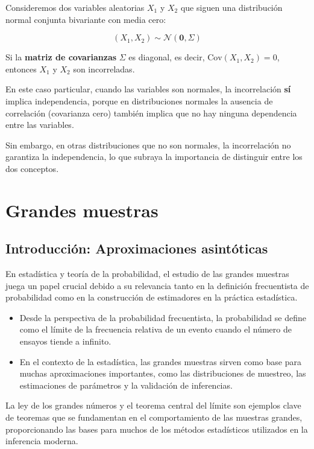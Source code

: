 \documentclass[
]{article}
\begin{document}
Consideremos dos variables aleatorias \(X_1\) y \(X_2\) que siguen una distribución normal conjunta bivariante con media cero:

\[
(X_1, X_2) \sim \mathcal{N}\left(\mathbf{0}, \Sigma \right)
\]

Si la \textbf{matriz de covarianzas} \(\Sigma\) es diagonal, es decir, \(\text{Cov}(X_1, X_2) = 0\), entonces \(X_1\) y \(X_2\) son incorreladas.

En este caso particular, cuando las variables son normales, la incorrelación \textbf{sí} implica independencia, porque en distribuciones normales la ausencia de correlación (covarianza cero) también implica que no hay ninguna dependencia entre las variables.

Sin embargo, en otras distribuciones que no son normales, la incorrelación no garantiza la independencia, lo que subraya la importancia de distinguir entre los dos conceptos.

\section{Grandes muestras}\label{grandes-muestras}

\subsection{Introducción: Aproximaciones asintóticas}\label{introducciuxf3n-aproximaciones-asintuxf3ticas}

En estadística y teoría de la probabilidad, el estudio de las grandes muestras juega un papel crucial debido a su relevancia tanto en la definición frecuentista de probabilidad como en la construcción de estimadores en la práctica estadística.

\begin{itemize}
\item
  Desde la perspectiva de la probabilidad frecuentista, la probabilidad se define como el límite de la frecuencia relativa de un evento cuando el número de ensayos tiende a infinito.
\item
  En el contexto de la estadística, las grandes muestras sirven como base para muchas aproximaciones importantes, como las distribuciones de muestreo, las estimaciones de parámetros y la validación de inferencias.
\end{itemize}

La ley de los grandes números y el teorema central del límite son ejemplos clave de teoremas que se fundamentan en el comportamiento de las muestras grandes, proporcionando las bases para muchos de los métodos estadísticos utilizados en la inferencia moderna.
\end{document}
